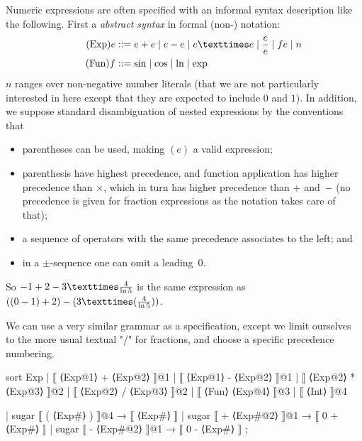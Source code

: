 \documentclass[11pt]{article} %
\begin{document}
\begin{example}\label{ex:deriv1}
  Numeric expressions are often specified with an informal syntax description like the
  following. First a \emph{abstract syntax} in formal (non-\HAX) notation:
  \begin{align}
    \tag{Exp}
    e &::= e+e \mid e-e \mid e×e \mid \frac{e}{e} \mid fe \mid n \\
    \tag{Fun}
    f &::= \op{sin} \mid \op{cos} \mid \op{ln} \mid \op{exp}
  \end{align}
  $n$ ranges over non-negative number literals (that we are not particularly interested in here
  except that they are expected to include $0$ and $1$).  In addition, we suppose standard
  disambiguation of nested expressions by the conventions that
  \begin{itemize}

  \item parentheses can be used, making $(e)$ a valid expression;

  \item parenthesis have highest precedence, and function application has higher precedence than
    $×$, which in turn has higher precedence than $+$ and~$-$ (no precedence is given for fraction
    expressions as the notation takes care of that);

  \item a sequence of operators with the same precedence associates to the left; and

  \item in a $\pm$-sequence one can omit a leading~$0$.

  \end{itemize}
  So $-1+2-3×\frac{4}{\op{ln}5}$ is the same expression as $((0-1)+2)-(3×(\frac{4}{\op{ln}5}))$.

  We can use a very similar grammar as a \HAX specification, except we limit ourselves to the more
  usual textual "/" for fractions, and choose a specific precedence numbering.
\begin{code}
sort Exp 
| ⟦ ⟨Exp@1⟩ + ⟨Exp@2⟩ ⟧@1                  
| ⟦ ⟨Exp@1⟩ - ⟨Exp@2⟩ ⟧@1                           
| ⟦ ⟨Exp@2⟩ * ⟨Exp@3⟩ ⟧@2                           
| ⟦ ⟨Exp@2⟩ / ⟨Exp@3⟩ ⟧@2                           
| ⟦ ⟨Fun⟩ ⟨Exp@4⟩ ⟧@3                               
| ⟦ ⟨Int⟩ ⟧@4                                       
                                           
| sugar ⟦ ( ⟨Exp#⟩ ) ⟧@4 → ⟦ ⟨Exp#⟩ ⟧               
| sugar ⟦ + ⟨Exp#@2⟩ ⟧@1 → ⟦ 0 + ⟨Exp#⟩ ⟧           
| sugar ⟦ - ⟨Exp#@2⟩ ⟧@1 → ⟦ 0 - ⟨Exp#⟩ ⟧
;         


\end{code}
\end{example}
\end{document}
